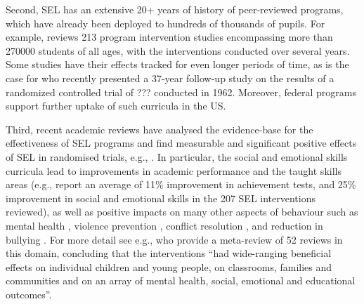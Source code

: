 \documentclass[prodmode,acmtochi]{acmsmall}
\newcommand{\rephrase}[1]{\textrm{\textrm{\textcolor{gray}{#1}}}}
\begin{document}
Second, SEL has an extensive 20+ years of history of peer-reviewed programs, which have already been deployed to hundreds of thousands of pupils. For example,  reviews 213 program intervention studies encompassing more than 270000 students of all ages, with the interventions conducted over several years. Some studies have their effects tracked for even longer periods of time, as is the case for  who recently presented a 37-year follow-up study on the results of a randomized controlled trial of ??? conducted in 1962. Moreover, federal programs support further uptake of such curricula in the US. 

Third, recent academic reviews have analysed the evidence-base for the effectiveness of SEL programs and find measurable and significant positive effects of SEL in randomised trials, e.g., \cite{Durlak2011,Greenberg2010,Weare2011}. In particular, the social and emotional skills curricula lead to improvements in  academic performance and the taught skills areas (e.g.,   report an average of 11\% improvement in achievement tests, and 25\% improvement in social and emotional skills in the 207 SEL interventions reviewed), as well as positive impacts on many other aspects of behaviour such as mental health \cite{Adi2007a}, violence prevention \cite{Mytton2006,Adi2007b}, conflict resolution \cite{Garrard2007},  and reduction in bullying \cite{Vreeman2007}. For more detail see e.g.,  who provide a meta-review of 52 reviews in this domain, concluding that the interventions ``had wide-ranging beneficial effects on individual children and young people, on classrooms, families and communities and on an array of mental health, social, emotional and educational outcomes''.


\end{document}
